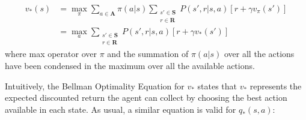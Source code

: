             \begin{definition}
                \label{def:bellmanoptvalue}
                \begin{align*}
                    v_{*}(s)    &= \max_{\pi} \sum_{a \in \mathbf{A}} \pi(a|s) 
                                \sum_{\substack{s' \in \mathbf{S}\\r \in \mathbf{R}}} P(s', r | s, a) 
                                \left[ r + \gamma v_{\pi}(s') \right] \\        
                                &= \max_{a} 
                                \sum_{\substack{s' \in \mathbf{S}\\r \in \mathbf{R}}} P(s', r | s, a) 
                                \left[ r
                                + \gamma v_{*}(s') \right]
                \end{align*}  
                where max operator over $\pi$ and the summation of $\pi(a|s)$ over all the actions have been condensed in the maximum over all the available actions.
            \end{definition}
            \noindent
            Intuitively, the Bellman Optimality Equation for $v_{*}$ states that $v_{*}$ represents the expected discounted return the agent can collect by choosing the best action available in each state. As usual, a similar equation is valid for $q_{*}(s,a)$:
            

